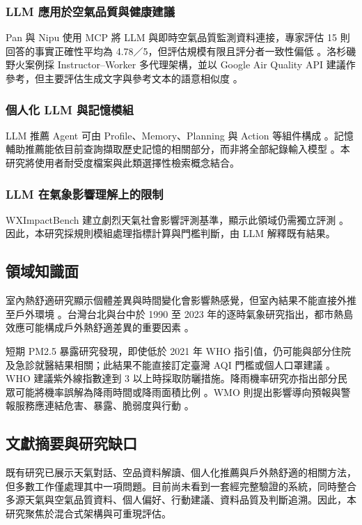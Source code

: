 \documentclass[conference]{IEEEtran}
\begin{document}
\subsubsection{LLM 應用於空氣品質與健康建議}
Pan 與 Nipu 使用 MCP 將 LLM 與即時空氣品質監測資料連接，專家評估 15 則回答的事實正確性平均為 4.78／5，但評估規模有限且評分者一致性偏低 \cite{pan2025}。洛杉磯野火案例採 Instructor--Worker 多代理架構，並以 Google Air Quality API 建議作參考，但主要評估生成文字與參考文本的語意相似度 \cite{gao2025}。

\subsubsection{個人化 LLM 與記憶模組}
LLM 推薦 Agent 可由 Profile、Memory、Planning 與 Action 等組件構成 \cite{peng2025}。記憶輔助推薦能依目前查詢擷取歷史記憶的相關部分，而非將全部紀錄輸入模型 \cite{chen2025}。本研究將使用者耐受度檔案與此類選擇性檢索概念結合。

\subsubsection{LLM 在氣象影響理解上的限制}
WXImpactBench 建立劇烈天氣社會影響評測基準，顯示此領域仍需獨立評測 \cite{yu2025}。因此，本研究採規則模組處理指標計算與門檻判斷，由 LLM 解釋既有結果。

\subsection{領域知識面}
室內熱舒適研究顯示個體差異與時間變化會影響熱感覺，但室內結果不能直接外推至戶外環境 \cite{abdulraheem2025}。台灣台北與台中於 1990 至 2023 年的逐時氣象研究指出，都市熱島效應可能構成戶外熱舒適差異的重要因素 \cite{shih2025}。

短期 PM2.5 暴露研究發現，即使低於 2021 年 WHO 指引值，仍可能與部分住院及急診就醫結果相關；此結果不能直接訂定臺灣 AQI 門檻或個人口罩建議 \cite{sun2024}。WHO 建議紫外線指數達到 3 以上時採取防曬措施。降雨機率研究亦指出部分民眾可能將機率誤解為降雨時間或降雨面積比例 \cite{joslyn2009}。WMO 則提出影響導向預報與警報服務應連結危害、暴露、脆弱度與行動 \cite{wmo2015}。

\subsection{文獻摘要與研究缺口}
既有研究已展示天氣對話、空品資料解讀、個人化推薦與戶外熱舒適的相關方法，但多數工作僅處理其中一項問題。目前尚未看到一套經完整驗證的系統，同時整合多源天氣與空氣品質資料、個人偏好、行動建議、資料品質及判斷追溯。因此，本研究聚焦於混合式架構與可重現評估。
\end{document}
